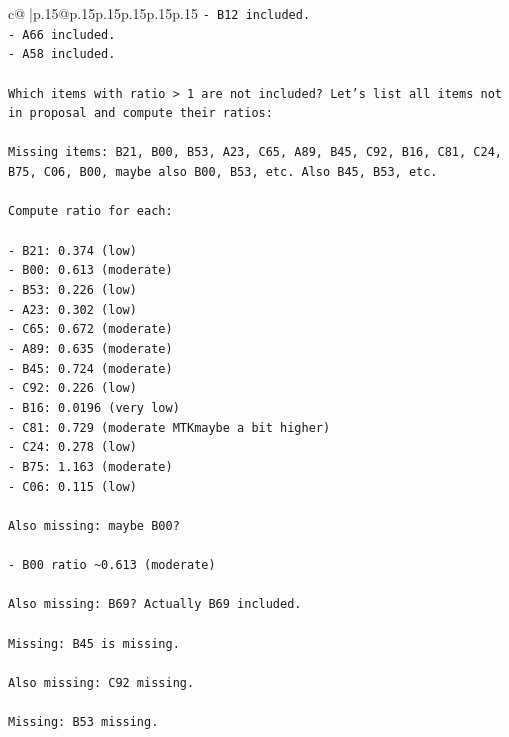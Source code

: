 \documentclass{article}
\begin{document}
{\begin{supertabular}{c@{$\;$}|p{.15\linewidth}@{}p{.15\linewidth}p{.15\linewidth}p{.15\linewidth}p{.15\linewidth}p{.15\linewidth}}
{{{\texttt{{-} B12 included.} \\
\texttt{{-} A66 included.} \\
\texttt{{-} A58 included.} \\
\\ 
\texttt{Which items with ratio > 1 are not included? Let's list all items not in proposal and compute their ratios:} \\
\\ 
\texttt{Missing items: B21, B00, B53, A23, C65, A89, B45, C92, B16, C81, C24, B75, C06, B00, maybe also B00, B53, etc. Also B45, B53, etc.} \\
\\ 
\texttt{Compute ratio for each:} \\
\\ 
\texttt{{-} B21: 0.374 (low)} \\
\texttt{{-} B00: 0.613 (moderate)} \\
\texttt{{-} B53: 0.226 (low)} \\
\texttt{{-} A23: 0.302 (low)} \\
\texttt{{-} C65: 0.672 (moderate)} \\
\texttt{{-} A89: 0.635 (moderate)} \\
\texttt{{-} B45: 0.724 (moderate)} \\
\texttt{{-} C92: 0.226 (low)} \\
\texttt{{-} B16: 0.0196 (very low)} \\
\texttt{{-} C81: 0.729 (moderate MTKmaybe a bit higher)} \\
\texttt{{-} C24: 0.278 (low)} \\
\texttt{{-} B75: 1.163 (moderate)} \\
\texttt{{-} C06: 0.115 (low)} \\
\\ 
\texttt{Also missing: maybe B00?} \\
\\ 
\texttt{{-} B00 ratio \textasciitilde{}0.613 (moderate)} \\
\\ 
\texttt{Also missing: B69? Actually B69 included.} \\
\\ 
\texttt{Missing: B45 is missing.} \\
\\ 
\texttt{Also missing: C92 missing.} \\
\\ 
\texttt{Missing: B53 missing.} \\
\\ 
}}}
\end{supertabular}}
\end{document}
